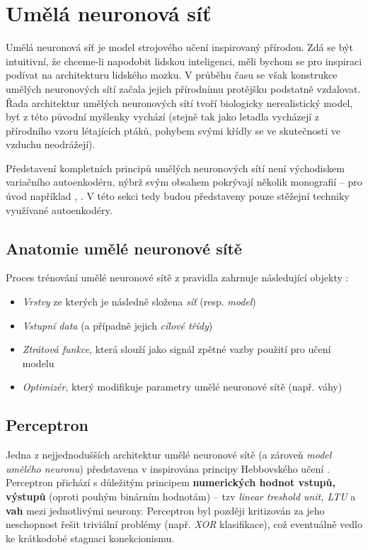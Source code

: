 \section{Umělá neuronová síť}
\label{neural_network}
Umělá neuronová síť je model strojového učení inspirovaný přírodou.
Zdá se být intuitivní, že chceme-li napodobit lidskou inteligenci, měli bychom se pro inspiraci podívat na architekturu lidského mozku.
V průběhu času se však konstrukce umělých neuronových sítí začala jejich přírodnímu protějšku podstatně vzdalovat.
Řada architektur umělých neuronových sítí tvoří biologicky nerealistický model, byť z této původní myšlenky vychází (stejně tak jako letadla vycházejí z přírodního vzoru létajících ptáků, pohybem svými křídly se ve skutečnosti ve vzduchu neodrážejí). \cite{Geron2019}

Představení kompletních principů umělých neuronových sítí není východiskem variačního autoenkodéru, nýbrž svým obsahem pokrývají několik monografií – pro úvod například \cite{Chollet2017}, \cite{Geron2019}.
V této sekci tedy budou představeny pouze stěžejní techniky využívané autoenkodéry.
\subsection{Anatomie umělé neuronové sítě}
Proces trénování umělé neuronové sítě z pravidla zahrnuje následující objekty \cite{Chollet2017}:
\begin{itemize}
    \item \emph{Vrstvy} ze kterých je následně složena \emph{síť} (resp. \emph{model})
    \item \emph{Vstupní data} (a případně jejich \emph{cílové třídy})
    \item \emph{Ztrátová funkce}, která slouží jako signál zpětné vazby použití pro učení modelu
    \item \emph{Optimizér}, který modifikuje parametry umělé neuronové sítě (např. váhy)
\end{itemize}

\subsection{Perceptron}
\label{sec:perceptron}
Jedna z nejjednodušších architektur umělé neuronové sítě (a zároveň \emph{model umělého neuronu}) představena v \cite{Rosenblatt1957} inspirována principy Hebbovského učení \cite{Hebb1949}.
Perceptron přichází s důležitým principem \textbf{numerických hodnot vstupů, výstupů} (oproti pouhým binárním hodnotám) – tzv \emph{linear treshold unit, LTU} a \textbf{vah} mezi jednotlivými neurony. 
Perceptron byl později kritizován \cite{Minsky1969} za jeho neschopnost řešit triviální problémy (např. \emph{XOR} klasifikace), což eventuálně vedlo ke krátkodobé stagnaci konekcionismu.

